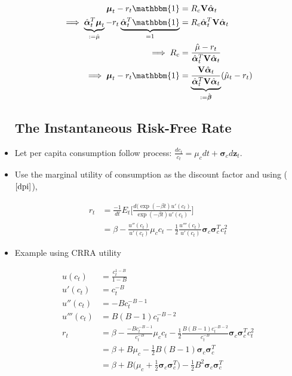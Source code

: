 \documentclass{article}
\newcommand{\Vbf}{\mathbf{V}}
\newcommand{\zbf}{\mathbf{z}}
\newcommand{\mubf}{\boldsymbol{\mu}}
\newcommand{\alphabf}{\boldsymbol{\alpha}}
\newcommand{\betabf}{\boldsymbol{\beta}}
\newcommand{\sigmabf}{\boldsymbol{\sigma}}
\newcommand{\onebf}{\mathbbm{1}}
\begin{document}
\begin{itemize}
\begin{align*}
\mubf_t - r_t \onebf &= R_c \Vbf \hat{\alphabf}_t \\
\implies
\underbrace{\hat{\alphabf}_t^T\mubf_t}_{:= \hat{\mu}} - r_t \underbrace{\hat{\alphabf}_t^T\onebf}_{=1}  &= R_c \hat{\alphabf}_t^T \Vbf \hat{\alphabf}_t \\
\implies 
R_c &= \frac{\hat{\mu} - r_t}{\hat{\alphabf}_t^T \Vbf \hat{\alphabf}_t} \\
\implies
\mubf_t - r_t \onebf &= \underbrace{\frac{\Vbf \hat{\alphabf}_t}{\hat{\alphabf}_t^T \Vbf \hat{\alphabf}_t}}_{:= \hat{\betabf}} (\hat{\mu}_t - r_t)
\end{align*}

\pagebreak

\subsection*{The Instantaneous Risk-Free Rate}

\item Let per capita consumption follow process: $\frac{dc_t}{c_t} = \mu_c dt + \sigmabf_c d \zbf_t$.

\item Use the marginal utility of consumption as the discount factor and using ($\ref{dpi}$),

\begin{align*}
r_t 
&= \frac{-1}{dt} E_t \Bigg[ \frac{d(\exp(-\beta t) u'(c_t)}{\exp(-\beta t) u'(c_t)} \Bigg] \\
&= \beta -  \frac{u''(c_t)}{u'(c_t)}  \mu_c c_t  - \frac{1}{2}  \frac{u'''(c_t)}{u'(c_t)} \sigmabf_c\sigmabf_c^T c_t^2 
\end{align*}

\item Example using CRRA utility

\begin{align*}
u(c_t) &= \frac{c_t^{1-B}}{1-B} \\
u'(c_t) &= c_t^{-B} \\
u''(c_t) &= -B c_t^{-B-1} \\
u'''(c_t) &= B(B-1) c_t^{-B-2} \\
r_t 
&= \beta -  \frac{-B c_t^{-B-1}}{c_t^{-B}}  \mu_c c_t  - \frac{1}{2}  \frac{B(B-1) c_t^{-B-2}}{c_t^{-B}} \sigmabf_c\sigmabf_c^T c_t^2 \\
&= \beta +  B  \mu_c  - \frac{1}{2}  B(B-1)  \sigmabf_c\sigmabf_c^T  \\
&=\beta + B \Bigg(\mu_c + \frac{1}{2} \sigmabf_c \sigmabf_c^T\Bigg) - \frac{1}{2} B^2 \sigmabf_c \sigmabf_c^T
\end{align*}


\end{itemize}
\end{document}
